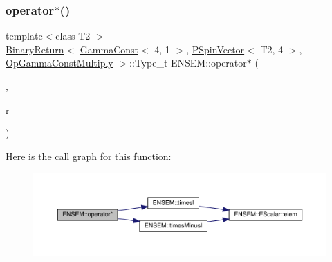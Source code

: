\subsubsection{\texorpdfstring{operator$\ast$()}{operator*()}\hspace{0.1cm}{\footnotesize\ttfamily [2/32]}}
{\footnotesize\ttfamily template$<$class T2 $>$ \\
\mbox{\hyperlink{structENSEM_1_1BinaryReturn}{Binary\+Return}}$<$ \mbox{\hyperlink{classENSEM_1_1GammaConst}{Gamma\+Const}}$<$ 4, 1 $>$, \mbox{\hyperlink{classENSEM_1_1PSpinVector}{P\+Spin\+Vector}}$<$ T2, 4 $>$, \mbox{\hyperlink{structENSEM_1_1OpGammaConstMultiply}{Op\+Gamma\+Const\+Multiply}} $>$\+::Type\+\_\+t E\+N\+S\+E\+M\+::operator$\ast$ (\begin{DoxyParamCaption}\item[{const \mbox{\hyperlink{classENSEM_1_1GammaConst}{Gamma\+Const}}$<$ 4, 1 $>$ \&}]{,  }\item[{const \mbox{\hyperlink{classENSEM_1_1PSpinVector}{P\+Spin\+Vector}}$<$ T2, 4 $>$ \&}]{r }\end{DoxyParamCaption})\hspace{0.3cm}{\ttfamily [inline]}}

Here is the call graph for this function\+:\nopagebreak
\begin{figure}[H]
\begin{center}
\leavevmode
\includegraphics[width=350pt]{dd/d6d/group__primspinvector_ga78fc0ed12245c6b5e7ab51e07bd4c553_cgraph}
\end{center}
\end{figure}
\mbox{\label{group__primspinvector_ga89998f51b7e59a05842c92f95ca427e4}} 
